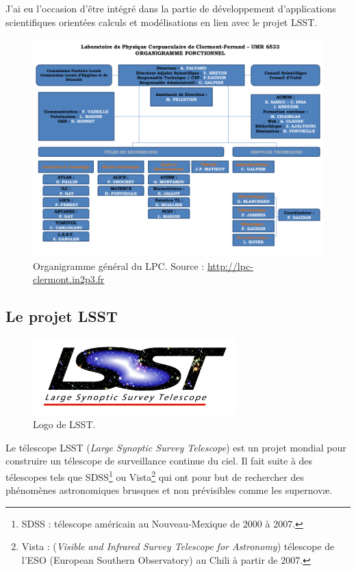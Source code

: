 J'ai eu l'occasion d'être intégré dans la partie de développement d'applications scientifiques orientées calculs et modélisations en lien avec le projet LSST.

	\begin{landscape}
		\begin{figure}[h!]
			\centering
			\includegraphics[height=0.95\textwidth]{img/lpc-orga.png}
			\caption[Organigramme général du LPC]{Organigramme général du LPC. Source : \url{http://lpc-clermont.in2p3.fr} }
		\end{figure}
	\end{landscape}

	\subsection{Le projet LSST}

	\begin{figure}[h!]
		\centering
		\includegraphics[width=0.7\textwidth]{logo/Logo_LSST.png}
		\caption[Logo de LSST]{Logo de LSST.}
	\end{figure}
Le télescope LSST (\emph{Large Synoptic Survey Telescope}) est un projet mondial pour construire un télescope de surveillance continue du ciel. Il fait suite à des télescopes tels que SDSS\footnote{SDSS : télescope américain au Nouveau-Mexique de 2000 à 2007.} ou Vista\footnote{Vista : (\emph{Visible and Infrared Survey Telescope for Astronomy}) télescope de l'ESO (European Southern Observatory) au Chili à partir de 2007.} qui ont pour but de rechercher des phénomènes astronomiques brusques et non prévisibles comme les supernovæ.

